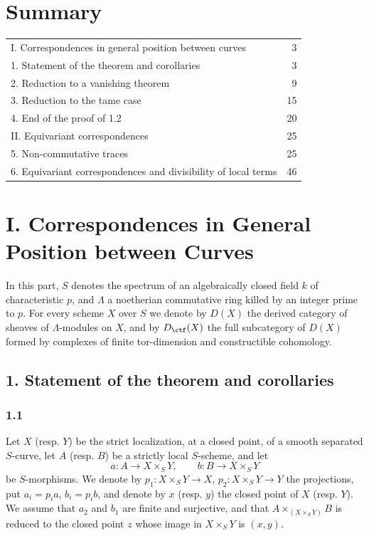 \section*{Summary}
\begin{tabular}{@{}p{}r@{}}
I. Correspondences in general position between curves & 3\\
1. Statement of the theorem and corollaries & 3\\
2. Reduction to a vanishing theorem & 9\\
3. Reduction to the tame case & 15\\
4. End of the proof of 1.2 & 20\\
II. Equivariant correspondences & 25\\
5. Non-commutative traces & 25\\
6. Equivariant correspondences and divisibility of local terms & 46
\end{tabular}

\section*{I. Correspondences in General Position between Curves}

In this part, $S$ denotes the spectrum of an algebraically closed field $k$ of characteristic $p$, and $\Lambda$ a noetherian commutative ring killed by an integer prime to $p$. For every scheme $X$ over $S$ we denote by $D(X)$ the derived category of sheaves of $\Lambda$-modules on $X$, and by $D_{\ctf}(X)$ the full subcategory of $D(X)$ formed by complexes of finite tor-dimension and constructible cohomology.

\subsection*{1. Statement of the theorem and corollaries}

\subsubsection*{1.1}
Let $X$ (resp. $Y$) be the strict localization, at a closed point, of a smooth separated $S$-curve, let $A$ (resp. $B$) be a strictly local $S$-scheme, and let
\[
a:A\longrightarrow X\times_S Y,
\qquad
b:B\longrightarrow X\times_S Y
\]
be $S$-morphisms. We denote by $p_1:X\times_S Y\to X$, $p_2:X\times_S Y\to Y$ the projections, put $a_i=p_i a$, $b_i=p_i b$, and denote by $x$ (resp. $y$) the closed point of $X$ (resp. $Y$). We assume that $a_2$ and $b_1$ are finite and surjective, and that $A\times_{(X\times_S Y)}B$ is reduced to the closed point $z$ whose image in $X\times_S Y$ is $(x,y)$.

